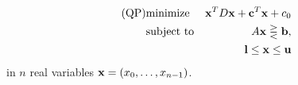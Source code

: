 \begin{eqnarray*}
\mbox{(QP)}& \mbox{minimize} 
& \mathbf{x}^{T}D\mathbf{x}+\mathbf{c}^{T}\mathbf{x}+c_0 \\
&\mbox{subject to}   & A\mathbf{x}\gtreqless \mathbf{b}, \\
&                    & \mathbf{l} \leq \mathbf{x} \leq \mathbf{u}
\end{eqnarray*}
in $n$ real variables $\mathbf{x}=(x_0,\ldots,x_{n-1})$.
